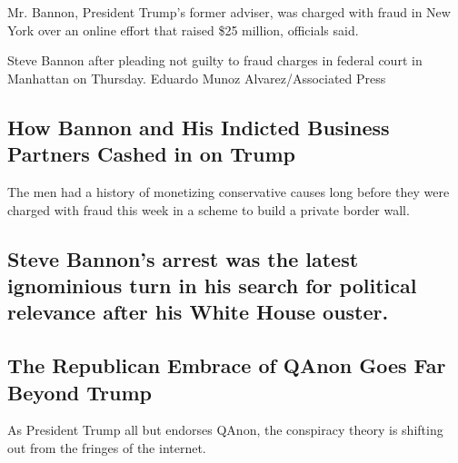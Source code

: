 Mr. Bannon, President Trump's former adviser, was charged with fraud in
New York over an online effort that raised \$25 million, officials said.

\href{/2020/08/20/nyregion/steve-bannon-arrested-indicted.html}{}

Steve Bannon after pleading not guilty to fraud charges in federal court
in Manhattan on Thursday. Eduardo Munoz Alvarez/Associated Press

\href{/2020/08/20/us/politics/bannon-we-build-the-wall.html}{}

\hypertarget{how-bannon-and-his-indicted-business-partners-cashed-in-on-trump}{%
\subsection{How Bannon and His Indicted Business Partners Cashed in on
Trump}\label{how-bannon-and-his-indicted-business-partners-cashed-in-on-trump}}

The men had a history of monetizing conservative causes long before they
were charged with fraud this week in a scheme to build a private border
wall.

\href{/2020/08/20/us/politics/stephen-bannon-arrest.html}{}

\hypertarget{steve-bannons-arrest-was-the-latest-ignominious-turn-in-his-search-for-political-relevance-after-his-white-house-ouster}{%
\subsection{Steve Bannon's arrest was the latest ignominious turn in his
search for political relevance after his White House
ouster.}\label{steve-bannons-arrest-was-the-latest-ignominious-turn-in-his-search-for-political-relevance-after-his-white-house-ouster}}

\href{/2020/08/20/us/politics/qanon-trump-republicans.html}{}

\hypertarget{the-republican-embrace-of-qanon-goes-far-beyond-trump}{%
\subsection{The Republican Embrace of QAnon Goes Far Beyond
Trump}\label{the-republican-embrace-of-qanon-goes-far-beyond-trump}}

As President Trump all but endorses QAnon, the conspiracy theory is
shifting out from the fringes of the internet.

\href{/2020/08/20/nyregion/donald-trump-taxes-cyrus-vance.html}{}

